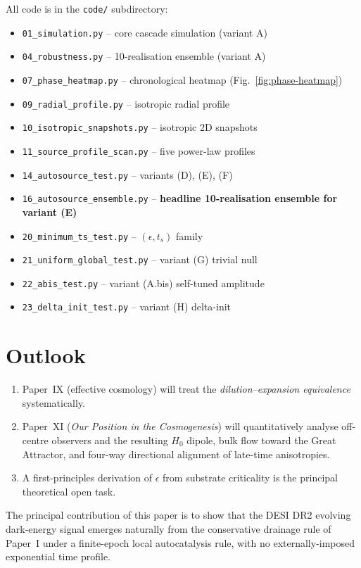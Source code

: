 \documentclass[11pt,a4paper]{article}
\begin{document}
All code is in the \texttt{code/} subdirectory:
\begin{itemize}
\item \texttt{01\_simulation.py} -- core cascade simulation (variant A)
\item \texttt{04\_robustness.py} -- 10-realisation ensemble (variant A)
\item \texttt{07\_phase\_heatmap.py} -- chronological heatmap (Fig.~\ref{fig:phase-heatmap})
\item \texttt{09\_radial\_profile.py} -- isotropic radial profile
\item \texttt{10\_isotropic\_snapshots.py} -- isotropic 2D snapshots
\item \texttt{11\_source\_profile\_scan.py} -- five power-law profiles
\item \texttt{14\_autosource\_test.py} -- variants (D), (E), (F)
\item \texttt{16\_autosource\_ensemble.py} -- \textbf{headline 10-realisation ensemble for variant (E)}
\item \texttt{20\_minimum\_ts\_test.py} -- $(\epsilon, t_s)$ family
\item \texttt{21\_uniform\_global\_test.py} -- variant (G) trivial null
\item \texttt{22\_abis\_test.py} -- variant (A.bis) self-tuned amplitude
\item \texttt{23\_delta\_init\_test.py} -- variant (H) delta-init
\end{itemize}

\FloatBarrier
\section{Outlook}
\label{sec:outlook}

\begin{enumerate}
\item Paper~IX (effective cosmology) will treat the
\emph{dilution--expansion equivalence} systematically.
\item Paper~XI (\emph{Our Position in the Cosmogenesis}) will
quantitatively analyse off-centre observers and the resulting
$H_0$ dipole, bulk flow toward the Great Attractor, and four-way
directional alignment of late-time anisotropies.
\item A first-principles derivation of $\epsilon$ from substrate
criticality is the principal theoretical open task.
\end{enumerate}

The principal contribution of this paper is to show that the DESI DR2
evolving dark-energy signal emerges naturally from the conservative
drainage rule of Paper~I under a finite-epoch local autocatalysis
rule, with no externally-imposed exponential time profile.
\end{document}
